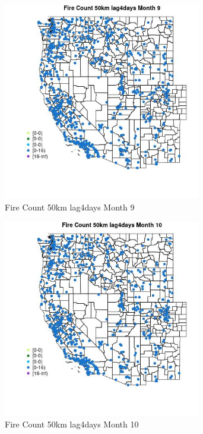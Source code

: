 \begin{figure} 
\centering  
\includegraphics[width=0.77\textwidth]{Code_Outputs/Report_ML_input_PM25_Step4_part_e_de_duplicated_aves_compiled_2019-05-21wNAs_MapObsMo9Fire_Count_50km_lag4days.jpg} 
\caption{\label{fig:Report_ML_input_PM25_Step4_part_e_de_duplicated_aves_compiled_2019-05-21wNAsMapObsMo9Fire_Count_50km_lag4days}Fire Count 50km lag4days Month 9} 
\end{figure} 
 

\begin{figure} 
\centering  
\includegraphics[width=0.77\textwidth]{Code_Outputs/Report_ML_input_PM25_Step4_part_e_de_duplicated_aves_compiled_2019-05-21wNAs_MapObsMo10Fire_Count_50km_lag4days.jpg} 
\caption{\label{fig:Report_ML_input_PM25_Step4_part_e_de_duplicated_aves_compiled_2019-05-21wNAsMapObsMo10Fire_Count_50km_lag4days}Fire Count 50km lag4days Month 10} 
\end{figure} 
 

